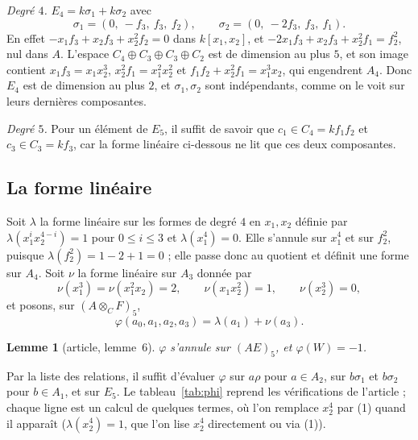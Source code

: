 \documentclass[11pt,a4paper]{amsart}
\theoremstyle{definition}
\theoremstyle{plain}
\newtheorem*{lemme}{Lemme}
\theoremstyle{remark}
\begin{document}
\emph{Degré $4$.} $E_4 = k\sigma_1 + k\sigma_2$ avec
\[
\sigma_1 = (0,\ -f_3,\ f_3,\ f_2), \qquad \sigma_2 = (0,\ -2f_3,\ f_3,\ f_1).
\]
En effet $-x_1f_3 + x_2f_3 + x_2^2f_2 = 0$ dans $k[x_1, x_2]$, et $-2x_1f_3 + x_2f_3 + x_2^2f_1 = f_2^2$, nul dans $A$. L'espace $C_4 \oplus C_3 \oplus C_3 \oplus C_2$ est de dimension au plus $5$, et son image contient $x_1f_3 = x_1x_2^3$, $x_2^2f_1 = x_1^2x_2^2$ et $f_1f_2 + x_2^2f_1 = x_1^3x_2$, qui engendrent $A_4$. Donc $E_4$ est de dimension au plus $2$, et $\sigma_1, \sigma_2$ sont indépendants, comme on le voit sur leurs dernières composantes.

\emph{Degré $5$.} Pour un élément de $E_5$, il suffit de savoir que $c_1 \in C_4 = kf_1f_2$ et $c_3 \in C_3 = kf_3$, car la forme linéaire ci-dessous ne lit que ces deux composantes.

\subsection{La forme linéaire}

Soit $\lambda$ la forme linéaire sur les formes de degré $4$ en $x_1, x_2$ définie par $\lambda(x_1^ix_2^{4-i}) = 1$ pour $0 \le i \le 3$ et $\lambda(x_1^4) = 0$. Elle s'annule sur $x_1^4$ et sur $f_2^2$, puisque $\lambda(f_2^2) = 1 - 2 + 1 = 0$ ; elle passe donc au quotient et définit une forme sur $A_4$. Soit $\nu$ la forme linéaire sur $A_3$ donnée par
\[
\nu(x_1^3) = \nu(x_1^2x_2) = 2, \qquad \nu(x_1x_2^2) = 1, \qquad \nu(x_2^3) = 0,
\]
et posons, sur $(A \otimes_C F)_5$,
\[
\varphi(a_0, a_1, a_2, a_3) = \lambda(a_1) + \nu(a_3).
\]

\begin{lemme}[article, lemme~6]
$\varphi$ s'annule sur $(AE)_5$, et $\varphi(W) = -1$.
\end{lemme}

Par la liste des relations, il suffit d'évaluer $\varphi$ sur $a\rho$ pour $a \in A_2$, sur $b\sigma_1$ et $b\sigma_2$ pour $b \in A_1$, et sur $E_5$. Le tableau~\ref{tab:phi} reprend les vérifications de l'article ; chaque ligne est un calcul de quelques termes, où l'on remplace $x_2^4$ par (1) quand il apparaît ($\lambda(x_2^4) = 1$, que l'on lise $x_2^4$ directement ou via (1)).
\end{document}
